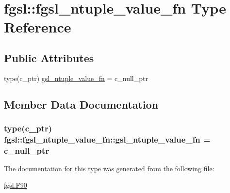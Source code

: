 \hypertarget{structfgsl_1_1fgsl__ntuple__value__fn}{}\section{fgsl\+:\+:fgsl\+\_\+ntuple\+\_\+value\+\_\+fn Type Reference}
\label{structfgsl_1_1fgsl__ntuple__value__fn}
\subsection*{Public Attributes}
\begin{DoxyCompactItemize}
\item 
type(c\+\_\+ptr) \hyperlink{structfgsl_1_1fgsl__ntuple__value__fn_a3df6fe4aa584fbd77e7c9ce3fe29059f}{gsl\+\_\+ntuple\+\_\+value\+\_\+fn} = c\+\_\+null\+\_\+ptr
\end{DoxyCompactItemize}


\subsection{Member Data Documentation}
\hypertarget{structfgsl_1_1fgsl__ntuple__value__fn_a3df6fe4aa584fbd77e7c9ce3fe29059f}{}
\subsubsection[{gsl\+\_\+ntuple\+\_\+value\+\_\+fn}]{\setlength{\rightskip}{0pt plus 5cm}type(c\+\_\+ptr) fgsl\+::fgsl\+\_\+ntuple\+\_\+value\+\_\+fn\+::gsl\+\_\+ntuple\+\_\+value\+\_\+fn = c\+\_\+null\+\_\+ptr}\label{structfgsl_1_1fgsl__ntuple__value__fn_a3df6fe4aa584fbd77e7c9ce3fe29059f}


The documentation for this type was generated from the following file\+:\begin{DoxyCompactItemize}
\item 
\hyperlink{fgsl_8F90}{fgsl.\+F90}\end{DoxyCompactItemize}
